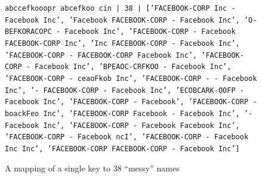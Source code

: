 \documentclass{article} %
\begin{document}
\begin{figure}
{\small \texttt{abccefkooopr abcefkoo cin | 38 | ['FACEBOOK-CORP Inc - Facebook Inc', 'Facebook FACEBOOK-CORP - Facebook Inc', 'O-BEFKORACOPC - Facebook Inc', 'FACEBOOK-CORP - Facebook FACEBOOK-CORP Inc', 'Inc FACEBOOK-CORP - Facebook Inc', 'FACEBOOK-CORP - FACEBOOK-CORP Facebook Inc', 'FACEBOOK-CORP - Facebook Inc', 'BPEAOC-CRFKOO - Facebook Inc', 'FACEBOOK-CORP - ceaoFkob Inc', 'FACEBOOK-CORP - - Facebook Inc', '- FACEBOOK-CORP - Facebook Inc', 'ECOBCARK-OOFP - Facebook Inc', 'FACEBOOK-CORP - Facebook', 'FACEBOOK-CORP - boackFeo Inc', 'FACEBOOK-CORP Facebook - Facebook Inc', '- Facebook Inc', 'FACEBOOK-CORP - Facebook Facebook Inc', 'FACEBOOK-CORP - Facebook ncI', 'FACEBOOK-CORP - Facebook Inc Inc', 'FACEBOOK-CORP FACEBOOK-CORP - Facebook Inc']}}
\caption{A mapping of a single key to 38 ``messy'' names}
\end{figure}




\end{document}
